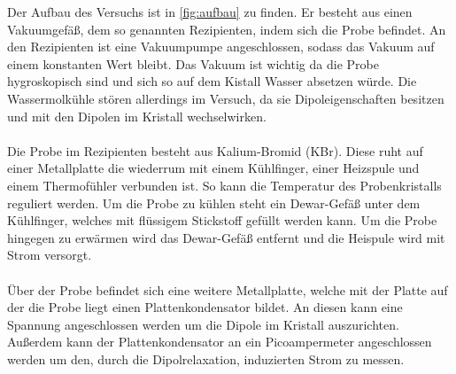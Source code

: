 Der Aufbau des Versuchs ist in \autoref{fig:aufbau} zu finden.
Er besteht aus einen Vakuumgefäß, dem so genannten Rezipienten, indem sich die Probe befindet.
An den Rezipienten ist eine Vakuumpumpe angeschlossen, sodass das Vakuum auf einem konstanten Wert bleibt.
Das Vakuum ist wichtig da die Probe hygroskopisch sind und sich so auf dem Kistall Wasser absetzen würde.
Die Wassermolkühle stören allerdings im Versuch, da sie Dipoleigenschaften besitzen und mit den Dipolen im Kristall wechselwirken.
\\\\
Die Probe im Rezipienten besteht aus Kalium-Bromid (KBr).
Diese ruht auf einer Metallplatte die wiederrum mit einem Kühlfinger, einer Heizspule und einem Thermofühler verbunden ist.
So kann die Temperatur des Probenkristalls reguliert werden.
Um die Probe zu kühlen steht ein Dewar-Gefäß unter dem Kühlfinger, welches mit flüssigem Stickstoff gefüllt werden kann.
Um die Probe hingegen zu erwärmen wird das Dewar-Gefäß entfernt und die Heispule wird mit Strom versorgt.
\\\\
Über der Probe befindet sich eine weitere Metallplatte, welche mit der Platte auf der die Probe liegt einen Plattenkondensator bildet.
An diesen kann eine Spannung angeschlossen werden um die Dipole im Kristall auszurichten.
Außerdem kann der Plattenkondensator an ein Picoampermeter angeschlossen werden um den, durch die Dipolrelaxation, induzierten Strom zu messen.

